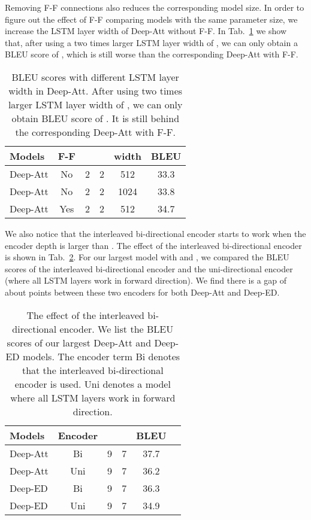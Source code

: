 \documentclass[11pt,letterpaper]{article}
\begin{document}
Removing F-F connections also reduces the corresponding model size. In order to figure out the effect of F-F comparing models with the same
parameter size, we increase the LSTM layer width of Deep-Att without F-F. In Tab.~\ref{tab:Results-BLEU-SizeCheck} we show that, after using a
two times larger LSTM layer width of , we can only obtain a BLEU score of , which is still worse than the corresponding Deep-Att
with F-F.
\begin{table}[!ht]
\footnotesize
\begin{center}
\begin{tabular}{|l|c|c|c|c|c|}
\hline
  Models & F-F & &  & width & BLEU \\
  \hline
  Deep-Att  & No  & 2  & 2 & 512 & 33.3 \\
  Deep-Att  & No  & 2  & 2 & 1024 & 33.8 \\
  \hline
  Deep-Att  & Yes & 2  & 2 & 512 & 34.7 \\
  \hline
\end{tabular}
\end{center}
\caption{\label{tab:Results-BLEU-SizeCheck} BLEU scores with different LSTM layer width in Deep-Att. After using two times larger LSTM layer
width of , we can only obtain BLEU score of . It is still behind the corresponding Deep-Att with F-F.}
\end{table}


We also notice that the interleaved bi-directional encoder starts to work when the encoder depth is larger than . The effect of the
interleaved bi-directional encoder is shown in Tab.~\ref{tab:Results-BLEU-BiCheck}. For our largest model with  and , we
compared the BLEU scores of the interleaved bi-directional encoder and the uni-directional encoder (where all LSTM layers work in forward
direction). We find there is a gap of about  points between these two encoders for both Deep-Att and Deep-ED.
\begin{table}[!ht]
\footnotesize
\begin{center}
\begin{tabular}{|l|c|c|c|c|c|}
\hline
  Models & Encoder & &  & BLEU \\
  \hline
  Deep-Att  & Bi  & 9  & 7 & 37.7 \\
  Deep-Att  & Uni & 9  & 7 & 36.2 \\
  \hline
  Deep-ED  & Bi  & 9  & 7 & 36.3 \\
  Deep-ED  & Uni & 9  & 7 & 34.9 \\
  \hline
\end{tabular}
\end{center}
\caption{\label{tab:Results-BLEU-BiCheck} The effect of the interleaved bi-directional encoder. We list the BLEU scores  of our largest
Deep-Att and Deep-ED models. The encoder term Bi denotes that the interleaved bi-directional encoder is used. Uni denotes a model where all
LSTM layers work in forward direction.}
\end{table}
\end{document}
